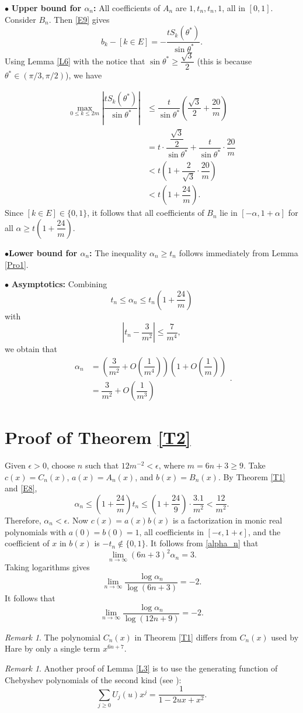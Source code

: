 \documentclass[a4paper,12pt,english,reqno]{amsart}
\theoremstyle{definition}
\theoremstyle{remark}
\newtheorem{rem}[thm]{Remark}
\begin{document}
$\bullet$ {\bf Upper bound for $\alpha_n$:}
All coefficients of $A_n$ are $1,t_n,t_n,1$, all in $[0,1]$. Consider $B_n$. Then \eqref{E9} gives \[b_k-[k\in E]=-\dfrac{tS_k(\theta^*)}{\sin \theta^*}.\]
Using Lemma \ref{L6} with the notice that $\sin \theta^*\geq \dfrac{\sqrt{3}}{2}$ (this is because $\theta^*\in (\pi/3,\pi/2)$), we have 

\[\begin{split}\max\limits_{0\leq k\leq 2m}\left|\dfrac{tS_k(\theta^*)}{\sin \theta^*}\right|&\leq \dfrac{t}{\sin \theta^*}\left(\dfrac{\sqrt{3}}{2}+\dfrac{20}{m}\right)\\
&=t\cdot \dfrac{\dfrac{\sqrt{3}}{2}}{\sin\theta^*}+\dfrac{t}{\sin\theta^*}\cdot\dfrac{20}{m}\\
&<t\left(1+\dfrac{2}{\sqrt{3}}\cdot \dfrac{20}{m}\right)\\
&<t\left(1+\dfrac{24}{m}\right).\end{split}\]
Since $[k\in E]\in \{0,1\}$, it follows that all coefficients of $B_n$ lie in $[-\alpha,1+\alpha]$ for all $\alpha\geq t\left(1+\dfrac{24}{m}\right)$. 

$\bullet${\bf Lower bound for $\alpha_n$:} The inequality $\alpha_n\geq t_n$ follows immediately from Lemma \ref{Pro1}.

$\bullet$ {\bf Asymptotics:} Combining \[t_n\leq \alpha_n\leq t_n\left(1+\dfrac{24}{m}\right)\]
with \[|t_n-\dfrac{3}{m^2}|\leq \dfrac{7}{m^4},\]
we obtain that 
\[\begin{split}\alpha_n&=\left(\dfrac{3}{m^2}+O\left(\dfrac{1}{m^4}\right)\right)\left(1+O\left(\dfrac{1}{m}\right)\right)\\
&=\dfrac{3}{m^2}+O\left(\dfrac{1}{m^3}\right)\end{split}.\]



\section{Proof of Theorem \ref{T2}}
Given $\epsilon>0$, choose $n$ such that $12m^{-2}<\epsilon$, where $m=6n+3\geq 9$. Take $c(x)=C_n(x)$, $a(x)=A_n(x)$, and $b(x)=B_n(x)$. By Theorem \ref{T1} and \eqref{E8},\[
\alpha_n\leq \left(1+\dfrac{24}{m}\right)t_n\leq \left(1+\dfrac{24}{9}\right)\cdot \dfrac{3.1}{m^2}<\dfrac{12}{m^2}.
\]
Therefore, $\alpha_n<\epsilon$. Now $c(x)=a(x)b(x)$ is a factorization in monic real polynomials with $a(0)=b(0)=1$, all coefficients in $[-\epsilon,1+\epsilon]$, and the coefficient of $x$ in $b(x)$ is $-t_n\not \in \{0,1\}$.
It follows from \eqref{alpha_n} that \[\lim\limits_{n\rightarrow \infty}{(6n+3)^2\alpha_n}=3.\]
Taking logarithms gives  
\[\lim\limits_{n\rightarrow\infty}\dfrac{\log \alpha_n}{\log (6n+3)}=-2.\]
It follows that \[\lim\limits_{n\rightarrow\infty}\dfrac{\log \alpha_n}{\log (12n+9)}=-2.\]
\begin{rem}The polynomial $C_n(x)$ in Theorem \ref{T1} differs from $C_n(x)$ used by Hare \cite{Hare} by only a single term $x^{6n+7}$.
\end{rem}
\begin{rem} Another proof of Lemma \ref{L3} is to use the generating function of Chebyshev polynomials of the second kind (see \cite{Ri}):
\[\sum\limits_{j\geq 0}U_j(u)x^j=\dfrac{1}{1-2ux+x^2}.\]
\end{rem}
\end{document}

